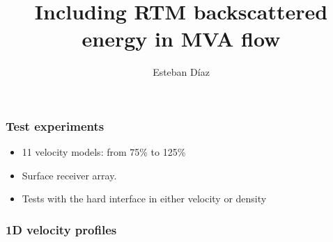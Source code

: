 

\title[]{Including RTM backscattered energy in MVA flow}
\subtitle{}
\author[]{Esteban  D\'{i}az}
\date{}
\logo{}

\def\big#1{\begin{center} \LARGE \textbf{#1} \end{center}}
\def\cen#1{\begin{center}        \textbf{#1} \end{center}}

 { \cwpcover }

\begin{frame} \frametitle{Test experiments}
\begin{itemize}
   \item 11 velocity models: from 75\% to 125\%
   \item Surface receiver array.
   \item Tests with the hard interface in either velocity or density
\end{itemize}
\end{frame}
\cwpnote{}


\begin{frame} \frametitle{1D velocity profiles}  \end{frame}



